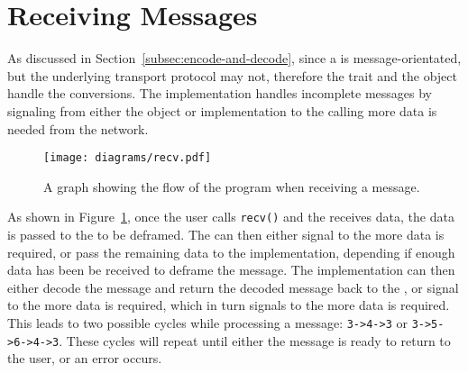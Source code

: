 \section{Receiving Messages}\label{sec:receiving-messages}
As discussed in Section~\ref{subsec:encode-and-decode}, since a \connection{} is message-orientated, but the underlying
transport protocol may not, therefore the \decode{} trait and the \framer{} object handle the conversions.
The implementation handles incomplete messages by signaling from either the \framer{} object or \decode{} implementation
to the calling \connection{} more data is needed from the network.

\begin{figure}[h]
    \texttt{[image: diagrams/recv.pdf]}
    \caption{A graph showing the flow of the program when receiving a message.}
    \label{fig:recv}
\end{figure}

As shown in Figure~\ref{fig:recv}, once the user calls \texttt{recv()} and the \connection{} receives data, the data is
passed to the \framer{} to be deframed.
The \framer{} can then either signal to the \connection{} more data is required, or pass the remaining data to the
\decode{} implementation, depending if enough data has been be received to deframe the message.
The \decode{} implementation can then either decode the message and return the decoded message back to the \connection{},
or signal to the \framer{} more data is required, which in turn signals to the \connection{} more data is required.
This leads to two possible cycles while processing a message: \texttt{3->4->3} or \texttt{3->5->6->4->3}.
These cycles will repeat until either the message is ready to return to the user, or an error occurs.

